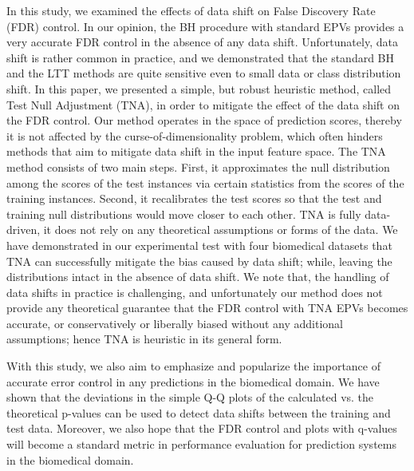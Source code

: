 \documentclass[10pt,letterpaper]{article}
\newcommand{\edit}[1]{#1} %
\begin{document}
In this study, we examined the effects of data shift on False Discovery Rate (FDR) control.
In our opinion, the BH procedure with standard EPVs provides a very accurate FDR control in the absence of any data shift.
Unfortunately, data shift is rather common in practice, and we demonstrated that the standard BH and the LTT methods are quite sensitive even to small data or class distribution shift.
In this paper, we presented a simple, but robust heuristic method, called Test Null Adjustment (TNA), in order to mitigate the effect of the data shift on the FDR control.
Our method operates in the space of prediction scores, thereby it is not affected by the curse-of-dimensionality problem, which often hinders methods that aim to mitigate data shift in the input feature space.
The TNA method consists of two main steps.
First, it approximates the null distribution among the scores of the test instances via certain statistics from the scores of the training instances.
Second, it recalibrates the test scores so that the test and training null distributions would move closer to each other.
TNA is fully data-driven, it does not rely on any theoretical assumptions or forms of the data.
We have demonstrated in our experimental test with four biomedical datasets that TNA can successfully mitigate the bias caused by data shift; while, leaving the distributions intact in the absence of data shift.
We note that, the handling of data shifts in practice is challenging, and unfortunately our method does not provide any theoretical guarantee that the FDR control with TNA EPVs becomes accurate, or conservatively or liberally biased without any additional assumptions; hence TNA is heuristic in its general form.

With this study, we also aim to emphasize and popularize the importance of accurate error control in any predictions in the biomedical domain.
We have shown that the deviations in the simple Q-Q plots of the calculated vs. the theoretical p-values can be used to detect data shifts between the training and test data.
Moreover, we also hope that the FDR control and plots with q-values will become a standard metric in performance evaluation for prediction systems in the biomedical domain.

\nolinenumbers

%
%


\end{document}
